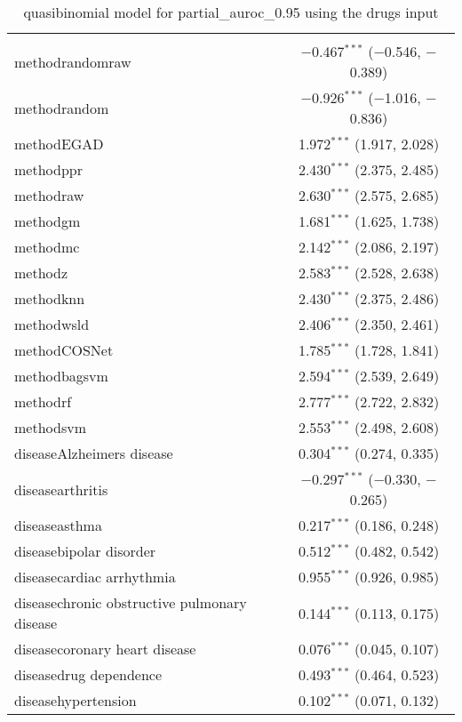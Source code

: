 
\begin{table}[!htbp] \centering 
  \caption{quasibinomial model for partial_auroc_0.95 using the drugs input} 
  \label{} 
\begin{tabular}{@{\extracolsep{5pt}}lc} 
\\[-1.8ex]\hline 
\hline \\[-1.8ex] 
 methodrandomraw & $-$0.467$^{***}$ ($-$0.546, $-$0.389) \\ 
  methodrandom & $-$0.926$^{***}$ ($-$1.016, $-$0.836) \\ 
  methodEGAD & 1.972$^{***}$ (1.917, 2.028) \\ 
  methodppr & 2.430$^{***}$ (2.375, 2.485) \\ 
  methodraw & 2.630$^{***}$ (2.575, 2.685) \\ 
  methodgm & 1.681$^{***}$ (1.625, 1.738) \\ 
  methodmc & 2.142$^{***}$ (2.086, 2.197) \\ 
  methodz & 2.583$^{***}$ (2.528, 2.638) \\ 
  methodknn & 2.430$^{***}$ (2.375, 2.486) \\ 
  methodwsld & 2.406$^{***}$ (2.350, 2.461) \\ 
  methodCOSNet & 1.785$^{***}$ (1.728, 1.841) \\ 
  methodbagsvm & 2.594$^{***}$ (2.539, 2.649) \\ 
  methodrf & 2.777$^{***}$ (2.722, 2.832) \\ 
  methodsvm & 2.553$^{***}$ (2.498, 2.608) \\ 
  diseaseAlzheimers disease & 0.304$^{***}$ (0.274, 0.335) \\ 
  diseasearthritis & $-$0.297$^{***}$ ($-$0.330, $-$0.265) \\ 
  diseaseasthma & 0.217$^{***}$ (0.186, 0.248) \\ 
  diseasebipolar disorder & 0.512$^{***}$ (0.482, 0.542) \\ 
  diseasecardiac arrhythmia & 0.955$^{***}$ (0.926, 0.985) \\ 
  diseasechronic obstructive pulmonary disease & 0.144$^{***}$ (0.113, 0.175) \\ 
  diseasecoronary heart disease & 0.076$^{***}$ (0.045, 0.107) \\ 
  diseasedrug dependence & 0.493$^{***}$ (0.464, 0.523) \\ 
  diseasehypertension & 0.102$^{***}$ (0.071, 0.132) \\ 

\end{tabular}
\end{table}
